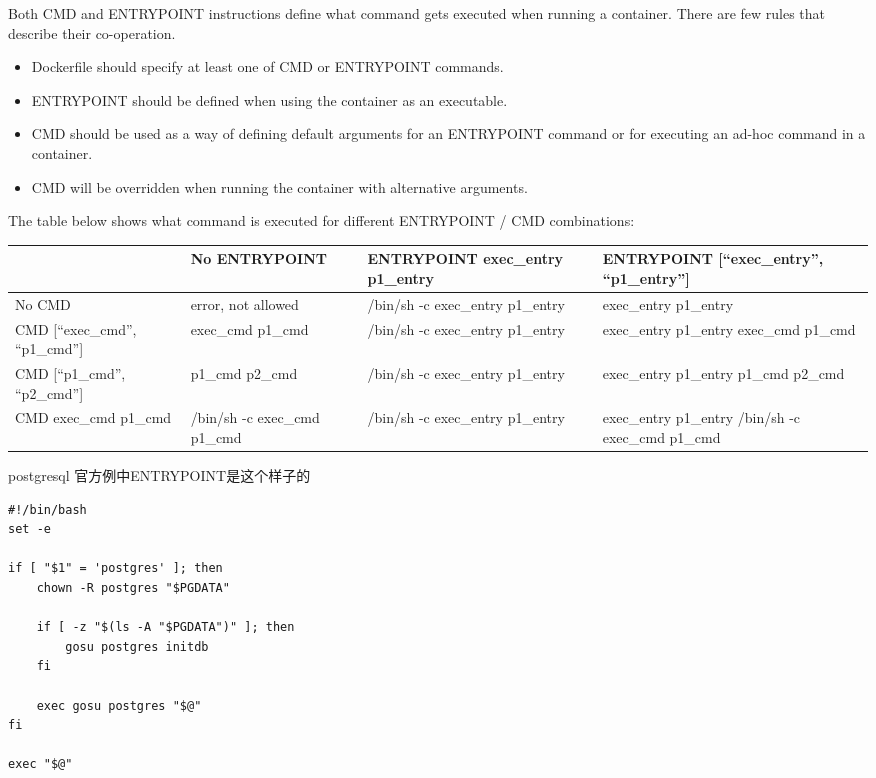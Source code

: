 \noindent
Both CMD and ENTRYPOINT instructions define what command gets executed when running a container. There are few rules that describe their co-operation.

\smallskip
\begin{itemize}
	\item \small{Dockerfile should specify at least one of CMD or ENTRYPOINT commands.}
	\item \small{ENTRYPOINT should be defined when using the container as an executable.}
	\item \small{CMD should be used as a way of defining default arguments for an ENTRYPOINT command or for executing an ad-hoc command in a container.}
	\item \small{CMD will be overridden when running the container with alternative arguments.}

\end{itemize}

\noindent
The table below shows what command is executed for different ENTRYPOINT / CMD combinations:

\noindent
\begin{table}[h]
\begin{tabular*}{\textwidth}{|p{2.8cm}|p{3cm}|p{4cm}|p{5cm}|}
	\hline
	&	No ENTRYPOINT &	ENTRYPOINT exec_entry p1_entry	& ENTRYPOINT [“exec_entry”, “p1_entry”] \\
	\hline
No CMD	&    error, not allowed & /bin/sh -c exec_entry p1_entry & exec_entry p1_entry \\
	\hline
CMD [“exec_cmd”, “p1_cmd”] & exec_cmd p1_cmd & /bin/sh -c exec_entry p1_entry & exec_entry p1_entry exec_cmd p1_cmd\\
	\hline
CMD [“p1_cmd”, “p2_cmd”] & p1_cmd p2_cmd & /bin/sh -c exec_entry p1_entry & exec_entry p1_entry p1_cmd p2_cmd \\
	\hline
CMD exec_cmd p1_cmd & /bin/sh -c exec_cmd p1_cmd & /bin/sh -c exec_entry p1_entry & exec_entry p1_entry /bin/sh -c exec_cmd p1_cmd \\
	\hline

\end{tabular*}
\end{table}

postgresql 官方例中ENTRYPOINT是这个样子的

\begin{lstlisting}
#!/bin/bash
set -e

if [ "$1" = 'postgres' ]; then
    chown -R postgres "$PGDATA"

    if [ -z "$(ls -A "$PGDATA")" ]; then
        gosu postgres initdb
    fi

    exec gosu postgres "$@"
fi

exec "$@"
\end{lstlisting}

